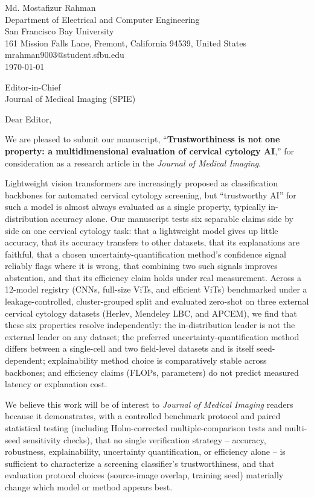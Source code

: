 \documentclass[12pt,letterpaper]{article}
\begin{document}
\begin{flushright}
Md. Mostafizur Rahman\\
Department of Electrical and Computer Engineering\\
San Francisco Bay University\\
161 Mission Falls Lane, Fremont, California 94539, United States\\
mrahman9003@student.sfbu.edu\\[6pt]
\today
\end{flushright}

\bigskip
\noindent Editor-in-Chief\\
Journal of Medical Imaging (SPIE)

\bigskip
\noindent Dear Editor,

\medskip
\noindent We are pleased to submit our manuscript, ``\textbf{Trustworthiness is not one property: a multidimensional evaluation of cervical cytology AI},'' for consideration as a research article in the \textit{Journal of Medical Imaging}.

\medskip
\noindent Lightweight vision transformers are increasingly proposed as classification backbones for automated cervical cytology screening, but ``trustworthy AI'' for such a model is almost always evaluated as a single property, typically in-distribution accuracy alone. Our manuscript tests six separable claims side by side on one cervical cytology task: that a lightweight model gives up little accuracy, that its accuracy transfers to other datasets, that its explanations are faithful, that a chosen uncertainty-quantification method's confidence signal reliably flags where it is wrong, that combining two such signals improves abstention, and that its efficiency claim holds under real measurement. Across a 12-model registry (CNNs, full-size ViTs, and efficient ViTs) benchmarked under a leakage-controlled, cluster-grouped split and evaluated zero-shot on three external cervical cytology datasets (Herlev, Mendeley LBC, and APCEM), we find that these six properties resolve independently: the in-distribution leader is not the external leader on any dataset; the preferred uncertainty-quantification method differs between a single-cell and two field-level datasets and is itself seed-dependent; explainability method choice is comparatively stable across backbones; and efficiency claims (FLOPs, parameters) do not predict measured latency or explanation cost.

\medskip
\noindent We believe this work will be of interest to \textit{Journal of Medical Imaging} readers because it demonstrates, with a controlled benchmark protocol and paired statistical testing (including Holm-corrected multiple-comparison tests and multi-seed sensitivity checks), that no single verification strategy -- accuracy, robustness, explainability, uncertainty quantification, or efficiency alone -- is sufficient to characterize a screening classifier's trustworthiness, and that evaluation protocol choices (source-image overlap, training seed) materially change which model or method appears best.
\end{document}

